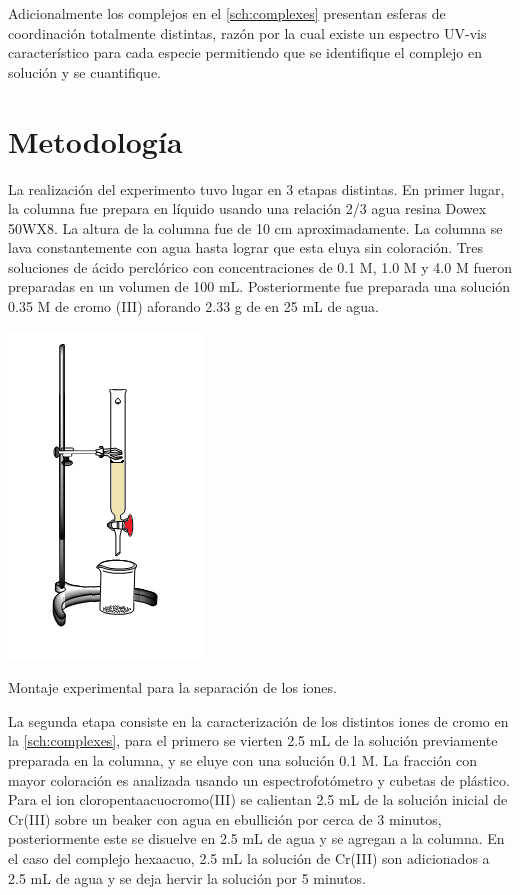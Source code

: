 \documentclass[fleqn,10pt]{SelfArx} %
\begin{document}
	Adicionalmente los complejos en el \autoref{sch:complexes} presentan esferas de coordinaci\'on totalmente distintas, raz\'on por la cual existe un espectro UV-vis caracter\'istico para cada especie permitiendo que se identifique el complejo en solución y se cuantifique.
	
	\section{Metodolog\'ia}
	La realizaci\'on del experimento tuvo lugar en 3 etapas distintas. En primer lugar, la columna fue prepara en l\'iquido usando una relaci\'on 2/3 agua resina Dowex 50WX8. La altura de la columna fue de 10 cm aproximadamente. La columna se lava constantemente con agua hasta lograr que esta eluya sin coloraci\'on. Tres soluciones de \'acido percl\'orico con concentraciones de 0.1 M, 1.0 M y 4.0 M fueron preparadas en un volumen de 100 mL. Posteriormente fue preparada una soluci\'on 0.35 M de cromo (III) aforando 2.33 g de  en 25 mL de agua.
	
	\begin{scheme}[h]
	    \centering
	    \includegraphics[scale=0.7]{images/montaje.png}
	    \caption{Montaje experimental para la separación de los iones.}
	    \label{sch:montaje}
	\end{scheme}
	
	La segunda etapa consiste en la caracterizaci\'on de los distintos iones de cromo en la \autoref{sch:complexes}, para el primero se vierten 2.5 mL de la soluci\'on previamente preparada en la columna, y se eluye con una soluci\'on  0.1 M. La fracci\'on con mayor coloraci\'on es analizada usando un espectrofot\'ometro y cubetas de pl\'astico. Para el ion cloropentaacuocromo(III) se calientan 2.5 mL de la soluci\'on inicial de Cr(III) sobre un beaker con agua en ebullici\'on por cerca de 3 minutos, posteriormente este se disuelve en 2.5 mL de agua y se agregan a la columna. En el caso del complejo hexaacuo, 2.5 mL la soluci\'on de Cr(III) son adicionados a 2.5 mL de agua y se deja hervir la soluci\'on por 5 minutos.
	
\end{document}
